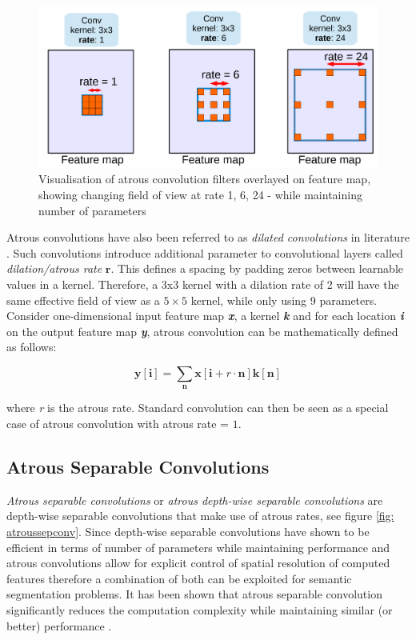 \begin{figure}[!ht]
	 \centering 
\includegraphics[scale = 0.25]{Graphics/Fundamentals/AtrousConvolution} 
	\caption[Atrous Convolutions]{Visualisation of atrous convolution filters overlayed on feature map, showing changing field of view at rate 1, 6, 24 - while maintaining number of parameters \cite{Deeplabv3+:journals/corr/abs-1802-02611}}
	\label{fig: atrousconv} 
\end{figure}

Atrous convolutions have also been referred to as \textit{dilated convolutions} in literature \cite{Yu2016MultiScaleCA}. Such convolutions introduce additional parameter to convolutional layers called \textit{dilation/atrous rate} $\mathbf{r}$. This defines a spacing by padding zeros between learnable values in a kernel. Therefore, a 3x3 kernel with a dilation rate of 2 will have the same effective field of view as a $5\times5$ kernel, while only using 9 parameters. Consider one-dimensional input feature map \textit{\textbf{x}}, a kernel \textit{\textbf{k}} and for each location \textit{\textbf{i}} on the output feature map \textit{\textbf{y}}, atrous convolution can be mathematically defined as follows:

\begin{equation}\boldsymbol{y}[\boldsymbol{i}]=\sum_{\boldsymbol{n}} \boldsymbol{x}[\boldsymbol{i}+r \cdot \boldsymbol{n}] \boldsymbol{k}[\boldsymbol{n}]\end{equation}

where \textit{r} is the atrous rate. Standard convolution can then be seen as a special case of atrous convolution with atrous rate = $1$.  


\subsection{Atrous Separable Convolutions}
\label{subsec:atroussepconv}
\textit{Atrous separable convolutions} or \textit{atrous depth-wise separable convolutions} are depth-wise separable convolutions that make use of atrous rates, see figure \ref{fig: atroussepconv}.
Since depth-wise separable convolutions have shown to be efficient in terms of number of parameters while maintaining performance and atrous convolutions allow for explicit control of spatial resolution of computed features therefore a combination of both can be exploited for semantic segmentation problems. It has been shown that atrous separable convolution significantly
reduces the computation complexity while maintaining similar (or better) performance \cite{Deeplabv3+:journals/corr/abs-1802-02611}.

